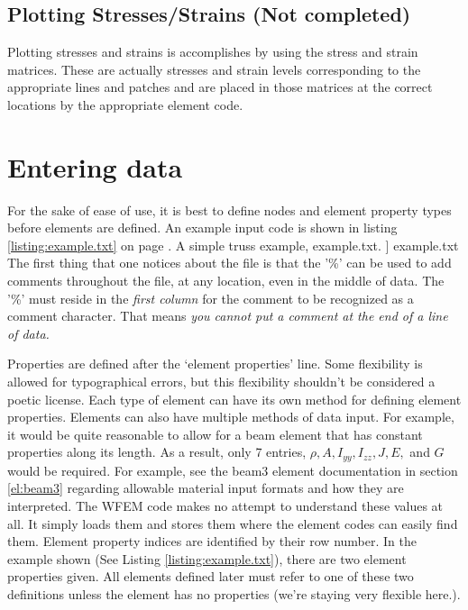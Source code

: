 \documentclass[12pt]{article}
\newcommand*{\command}[1]{\textsf{#1}}
\newcommand{\includelisting}[2]{{\small\label{listing:#1}#2, #1. }]{ #1}}}
\begin{document}
\subsection{Plotting Stresses/Strains (Not completed)}
Plotting stresses and strains is accomplishes by using the
\command{stress} and \command{strain} matrices. These are actually
stresses and strain levels corresponding to the appropriate lines and
patches and are placed in those matrices at the correct locations by
the appropriate element code.
\section{Entering data}
For the sake of ease of use, it is best to define nodes and element property types before elements are defined. An example input code is shown in listing \ref{listing:example.txt} on page \pageref{example.txt}. 
%
\includelisting{example.txt}{A simple truss example\label{example.txt}}
The first thing that one notices about the file is that the '\%' can
be used to add comments throughout the file, at any location, even in
the middle of data. The '\%' must reside in the \emph{first column} for the
comment to be recognized as a comment character. That means \emph{you cannot put a comment at the end of a line of data.} 

Properties are defined after the `element properties' line. Some flexibility is allowed for typographical errors, but this flexibility shouldn't be considered a poetic license. Each type of element can have its own method for defining element properties. Elements can also have multiple methods of data input. For example, it would be quite reasonable to allow for a beam element that has constant properties along its length. As a result, only 7 entries, $\rho, A, I_{yy}, I_{zz}, J, E,$ and $G$ would be required. For example, see the \command{beam3} element documentation in section \ref{el:beam3} regarding allowable material input formats and how they are interpreted. The WFEM code makes no attempt to understand these values at all. It simply loads them and stores them where the element codes can easily find them. Element property indices are identified by their row number. In the example shown (See Listing \ref{listing:example.txt}), there are two element properties given. All elements defined later must refer to one of these two definitions unless the element has no properties (we're staying very flexible here.).
\end{document}
